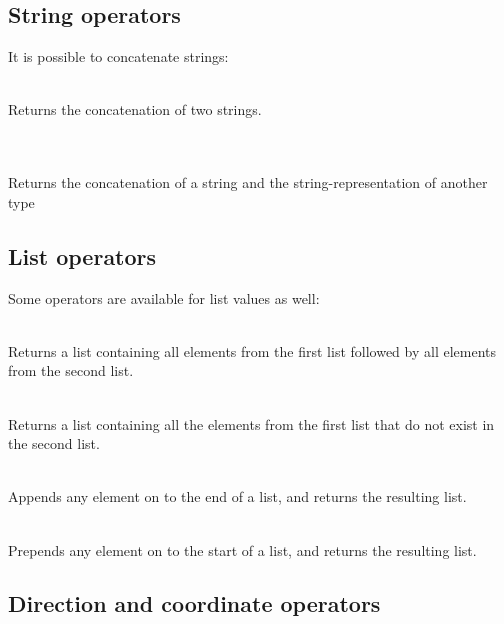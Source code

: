 \subsection{String operators}

It is possible to concatenate strings:
\begin{dlist}
  \item {} \\
    Returns the concatenation of two strings.
  \item {} \\
    \\
    Returns the concatenation of a string and the string-representation of another type
\end{dlist}

\subsection{List operators}

Some operators are available for list values as well:
\begin{dlist}
\item {} \\
  Returns a list containing all elements from the first list followed
  by all elements from the second list.
\item {} \\
  Returns a list containing all the elements from the first list that
  do not exist in the second list.
\item {} \\
  Appends any element on to the end of a list, and returns the resulting list.
\item {} \\
  Prepends any element on to the start of a list, and returns the resulting list.
\end{dlist}

\subsection{Direction and coordinate operators}

